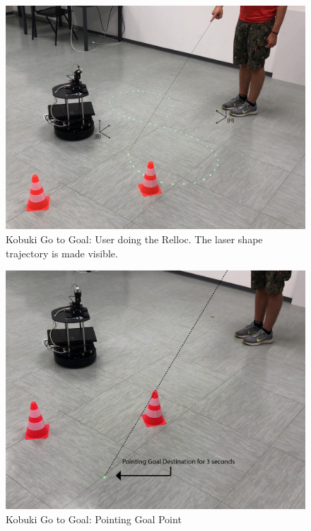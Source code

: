 \begin{figure}
	\centering
	\includegraphics[width=\textwidth]{img/kgtgRelloc2.png}%
	\caption[Kobuki Go to Goal: User doing the Relloc]{Kobuki Go to Goal: User doing the Relloc. The laser shape trajectory is made visible.}
	\label{fig:kgtgRelloc}
\end{figure}
\begin{figure}
	\centering
	\includegraphics[width=\textwidth]{img/kgtgPointing.png}%
	\caption{Kobuki Go to Goal: Pointing Goal Point}
	\label{fig:kgtgPointing}
\end{figure}
